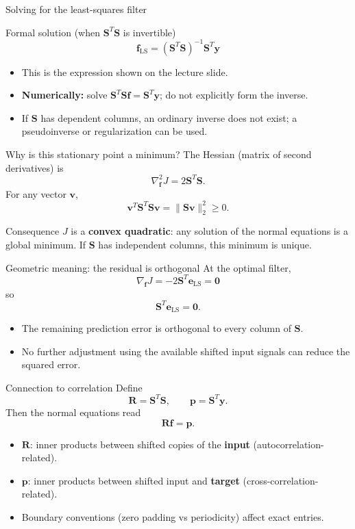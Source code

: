 \documentclass[aspectratio=169,11pt]{beamer}
\newcommand{\Smat}{\mathbf S}
\newcommand{\fvec}{\mathbf f}
\newcommand{\yvec}{\mathbf y}
\newcommand{\evec}{\mathbf e}
\newcommand{\Rmat}{\mathbf R}
\newcommand{\pvec}{\mathbf p}
\begin{document}
\begin{frame}{Solving for the least-squares filter}
\begin{block}{Formal solution (when $\Smat^T\Smat$ is invertible)}
\[\boxed{\fvec_{\mathrm{LS}}=(\Smat^T\Smat)^{-1}\Smat^T\yvec}\]
\end{block}
\begin{itemize}
\item This is the expression shown on the lecture slide.
\item \textbf{Numerically:} solve $\Smat^T\Smat\fvec=\Smat^T\yvec$; do not explicitly form the inverse.
\item If $\Smat$ has dependent columns, an ordinary inverse does not exist; a pseudoinverse or regularization can be used.
\end{itemize}
\end{frame}

\begin{frame}{Why is this stationary point a minimum?}
\small The Hessian (matrix of second derivatives) is
\[\nabla_{\fvec}^2J=2\Smat^T\Smat.\]
For any vector $\mathbf v$,
\[\mathbf v^T\Smat^T\Smat\mathbf v=\|\Smat\mathbf v\|_2^2\ge0.\]
\begin{block}{Consequence}
$J$ is a \textbf{convex quadratic}: any solution of the normal equations is a global minimum. If $\Smat$ has independent columns, this minimum is unique.
\end{block}
\end{frame}

\begin{frame}{Geometric meaning: the residual is orthogonal}
At the optimal filter,
\[\nabla_{\fvec}J=-2\Smat^T\evec_{\mathrm{LS}}=\mathbf0\]
so
\[\boxed{\Smat^T\evec_{\mathrm{LS}}=\mathbf0}.\]
\begin{itemize}
\item The remaining prediction error is orthogonal to every column of $\Smat$.
\item No further adjustment using the available shifted input signals can reduce the squared error.
\end{itemize}
\end{frame}

\begin{frame}{Connection to correlation}
Define
\[\Rmat=\Smat^T\Smat,\qquad \pvec=\Smat^T\yvec.\]
Then the normal equations read
\[\boxed{\Rmat\fvec=\pvec}.\]
\begin{itemize}
\item $\Rmat$: inner products between shifted copies of the \textbf{input} (autocorrelation-related).
\item $\pvec$: inner products between shifted input and \textbf{target} (cross-correlation-related).
\item Boundary conventions (zero padding vs periodicity) affect exact entries.
\end{itemize}
\end{frame}
\end{document}
